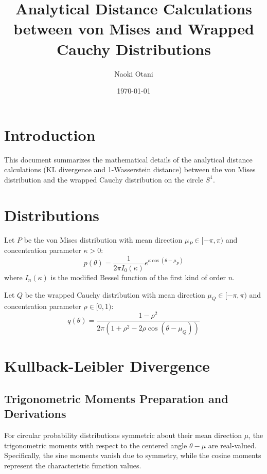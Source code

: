 \documentclass[11pt,a4paper]{article}
\title{Analytical Distance Calculations between von Mises and Wrapped Cauchy Distributions}
\author{Naoki Otani}
\date{\today}
\begin{document}
\maketitle

\section{Introduction}
This document summarizes the mathematical details of the analytical distance calculations (KL divergence and 1-Wasserstein distance) between the von Mises distribution and the wrapped Cauchy distribution on the circle $S^1$.

\section{Distributions}
Let $P$ be the von Mises distribution with mean direction $\mu_P \in [-\pi, \pi)$ and concentration parameter $\kappa > 0$:
\begin{equation}
p(\theta) = \frac{1}{2\pi I_0(\kappa)} e^{\kappa \cos(\theta - \mu_P)}
\end{equation}
where $I_n(\kappa)$ is the modified Bessel function of the first kind of order $n$.

Let $Q$ be the wrapped Cauchy distribution with mean direction $\mu_Q \in [-\pi, \pi)$ and concentration parameter $\rho \in [0, 1)$:
\begin{equation}
q(\theta) = \frac{1 - \rho^2}{2\pi (1 + \rho^2 - 2\rho \cos(\theta - \mu_Q))}
\end{equation}

\section{Kullback-Leibler Divergence}

\subsection{Trigonometric Moments Preparation and Derivations}
For circular probability distributions symmetric about their mean direction $\mu$, the trigonometric moments with respect to the centered angle $\theta - \mu$ are real-valued. Specifically, the sine moments vanish due to symmetry, while the cosine moments represent the characteristic function values.
\end{document}
